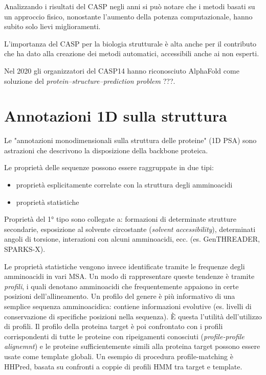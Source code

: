 {\par Analizzando i risultati del CASP negli anni si può notare che i metodi basati su un approccio fisico, nonostante l'aumento della potenza computazionale, hanno subito solo lievi miglioramenti.

\par L'importanza del CASP per la biologia strutturale è alta anche per il contributo che ha dato alla creazione dei metodi automatici, accessibili anche ai non esperti.

\par Nel 2020 gli organizzatori del CASP14 hanno riconosciuto AlphaFold come soluzione del \textit{protein–structure–prediction problem} ???. \\

}

\section{Annotazioni 1D sulla struttura} \label{sec:predizione-structural-features}

Le "annotazioni monodimensionali sulla struttura delle proteine" (1D PSA) sono astrazioni che descrivono la disposizione della backbone proteica.

Le proprietà delle sequenze possono essere raggruppate in due tipi:
\begin{itemize}
	\item proprietà esplicitamente correlate con la struttura degli amminoacidi
	\item proprietà statistiche
\end{itemize}

Proprietà del 1° tipo sono collegate a: formazioni di determinate strutture secondarie, esposizione al solvente circostante (\textit{solvent accessibility}), determinati angoli di torsione, interazioni con alcuni amminoacidi, ecc. (es. GenTHREADER, SPARKS-X).

\par Le proprietà statistiche vengono invece identificate tramite le frequenze degli amminoacidi in vari MSA. Un modo di rappresentare queste tendenze è tramite \textit{profili}, i quali denotano amminoacidi che frequentemente appaiono in certe posizioni dell'allineamento. Un profilo del genere è più informativo di una semplice sequenza amminoacidica: contiene informazioni evolutive (es. livelli di conservazione di specifiche posizioni nella sequenza). È questa l'utilità dell'utilizzo di profili. Il profilo della proteina target è poi confrontato con i profili corrispondenti di tutte le proteine con ripeigamenti conosciuti (\textit{profile-profile alignemnt}) e le proteine sufficientemente simili alla proteina target possono essere usate come template globali. Un esempio di procedura profile-matching è HHPred, basata su confronti a coppie di profili HMM tra target e template.

